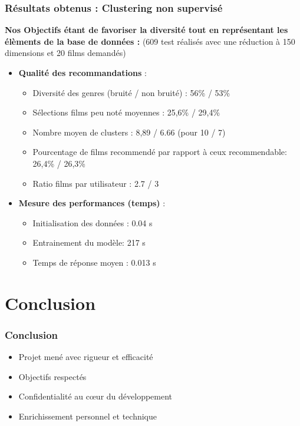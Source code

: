 \documentclass{beamer}
\begin{document}
    \begin{frame}
    \frametitle{Résultats obtenus : Clustering non supervisé}
    \scriptsize
    \textbf{Nos Objectifs étant de favoriser la diversité tout en représentant les élèments de la base de données  :}
    (609 test réalisés avec une réduction à 150 dimensions et 20 films demandés)
    \vspace{0.3cm}
    \begin{itemize}
        \item \textbf{Qualité des recommandations} :

        \begin{itemize}
            \item Diversité des genres (bruité / non bruité) : 56\% / 53\%
            \item Sélections films peu noté moyennes : 25,6\% / 29,4\%
            \item Nombre moyen de clusters : 8,89 / 6.66 (pour 10 / 7)
            \item Pourcentage de films recommendé par rapport à ceux recommendable: 26,4\% / 26,3\%
            \item Ratio films par utilisateur  :  2.7 / 3
        \end{itemize}
        \item \textbf{Mesure des performances (temps)} :
        \begin{itemize}
            \item Initialisation des données :  0.04 s
            \item Entrainement du modèle: 217 s
            \item Temps de réponse moyen : 0.013 s
        \end{itemize}
    \end{itemize}
\end{frame}



    \section{Conclusion}
    \begin{frame}
        \frametitle{Conclusion}
        \begin{itemize}
            \item Projet mené avec rigueur et efficacité
            \item Objectifs respectés
            \item Confidentialité au cœur du développement
            \item Enrichissement personnel et technique
        \end{itemize}
    \end{frame}
\end{document}
